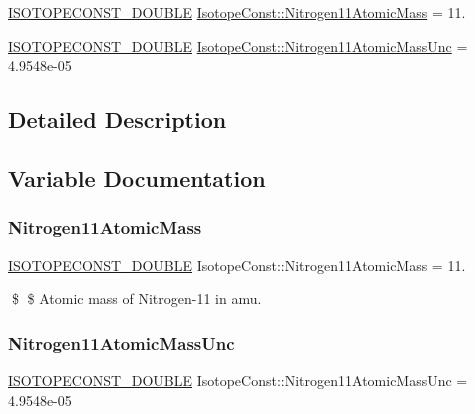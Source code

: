 \begin{DoxyCompactItemize}
\item 
\mbox{\hyperlink{group___isotope_const-_macros_ga8f45a7272ce02c0b4c65c44636ed719a}{I\+S\+O\+T\+O\+P\+E\+C\+O\+N\+S\+T\+\_\+\+D\+O\+U\+B\+LE}} \mbox{\hyperlink{group___isotope_const-_nitrogen-_n11_ga05d3c20e5bcb07767cac65ce86ca934c}{Isotope\+Const\+::\+Nitrogen11\+Atomic\+Mass}} = 11.
\item 
\mbox{\hyperlink{group___isotope_const-_macros_ga8f45a7272ce02c0b4c65c44636ed719a}{I\+S\+O\+T\+O\+P\+E\+C\+O\+N\+S\+T\+\_\+\+D\+O\+U\+B\+LE}} \mbox{\hyperlink{group___isotope_const-_nitrogen-_n11_ga814cc5ba752d997fb50b24e3a63cbf6e}{Isotope\+Const\+::\+Nitrogen11\+Atomic\+Mass\+Unc}} = 4.\+9548e-\/05
\end{DoxyCompactItemize}


\subsection{Detailed Description}


\subsection{Variable Documentation}
\mbox{\label{group___isotope_const-_nitrogen-_n11_ga05d3c20e5bcb07767cac65ce86ca934c}} 
\subsubsection{\texorpdfstring{Nitrogen11\+Atomic\+Mass}{Nitrogen11AtomicMass}}
{\footnotesize\ttfamily \mbox{\hyperlink{group___isotope_const-_macros_ga8f45a7272ce02c0b4c65c44636ed719a}{I\+S\+O\+T\+O\+P\+E\+C\+O\+N\+S\+T\+\_\+\+D\+O\+U\+B\+LE}} Isotope\+Const\+::\+Nitrogen11\+Atomic\+Mass = 11.}

\$ \$ Atomic mass of Nitrogen-\/11 in amu. \mbox{\label{group___isotope_const-_nitrogen-_n11_ga814cc5ba752d997fb50b24e3a63cbf6e}} 
\subsubsection{\texorpdfstring{Nitrogen11\+Atomic\+Mass\+Unc}{Nitrogen11AtomicMassUnc}}
{\footnotesize\ttfamily \mbox{\hyperlink{group___isotope_const-_macros_ga8f45a7272ce02c0b4c65c44636ed719a}{I\+S\+O\+T\+O\+P\+E\+C\+O\+N\+S\+T\+\_\+\+D\+O\+U\+B\+LE}} Isotope\+Const\+::\+Nitrogen11\+Atomic\+Mass\+Unc = 4.\+9548e-\/05}

